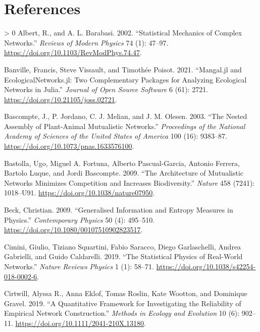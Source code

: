 \documentclass[10pt,oneside]{article}
\newlength{\cslhangindent}
\newenvironment{CSLReferences}[3] %
 {%
  \setlength{\parindent}{0pt}
  \ifodd #1 \everypar{\setlength{\hangindent}{\cslhangindent}}\ignorespaces\fi
  \ifnum #2 > 0
  \setlength{\parskip}{#2\baselineskip}
  \fi
 }%
 {}
\begin{document}
\hypertarget{references}{%
\section*{References}\label{references}}

\hypertarget{refs}{}
\begin{CSLReferences}{1}{0}
\leavevmode\hypertarget{ref-Albert2002StaMec}{}%
Albert, R., and A. L. Barabasi. 2002. {``Statistical Mechanics of
Complex Networks.''} \emph{Reviews of Modern Physics} 74 (1): 47--97.
\url{https://doi.org/10.1103/RevModPhys.74.47}.

\leavevmode\hypertarget{ref-Banville2021ManJla}{}%
Banville, Francis, Steve Vissault, and Timothée Poisot. 2021.
{``Mangal.jl and EcologicalNetworks.jl: Two Complementary Packages for
Analyzing Ecological Networks in Julia.''} \emph{Journal of Open Source
Software} 6 (61): 2721. \url{https://doi.org/10.21105/joss.02721}.

\leavevmode\hypertarget{ref-Bascompte2003NesAssa}{}%
Bascompte, J., P. Jordano, C. J. Melian, and J. M. Olesen. 2003. {``The
Nested Assembly of Plant-Animal Mutualistic Networks.''}
\emph{Proceedings of the National Academy of Sciences of the United
States of America} 100 (16): 9383--87.
\url{https://doi.org/10.1073/pnas.1633576100}.

\leavevmode\hypertarget{ref-Bastolla2009ArcMut}{}%
Bastolla, Ugo, Miguel A. Fortuna, Alberto Pascual-Garcia, Antonio
Ferrera, Bartolo Luque, and Jordi Bascompte. 2009. {``The Architecture
of Mutualistic Networks Minimizes Competition and Increases
Biodiversity.''} \emph{Nature} 458 (7241): 1018--U91.
\url{https://doi.org/10.1038/nature07950}.

\leavevmode\hypertarget{ref-Beck2009GenInf}{}%
Beck, Christian. 2009. {``Generalised Information and Entropy Measures
in Physics.''} \emph{Contemporary Physics} 50 (4): 495--510.
\url{https://doi.org/10.1080/00107510902823517}.

\leavevmode\hypertarget{ref-Cimini2019StaPhy}{}%
Cimini, Giulio, Tiziano Squartini, Fabio Saracco, Diego Garlaschelli,
Andrea Gabrielli, and Guido Caldarelli. 2019. {``The Statistical Physics
of Real-World Networks.''} \emph{Nature Reviews Physics} 1 (1): 58--71.
\url{https://doi.org/10.1038/s42254-018-0002-6}.

\leavevmode\hypertarget{ref-Cirtwill2019QuaFrac}{}%
Cirtwill, Alyssa R., Anna Eklof, Tomas Roslin, Kate Wootton, and
Dominique Gravel. 2019. {``A Quantitative Framework for Investigating
the Reliability of Empirical Network Construction.''} \emph{Methods in
Ecology and Evolution} 10 (6): 902--11.
\url{https://doi.org/10.1111/2041-210X.13180}.


\end{CSLReferences}
\end{document}
